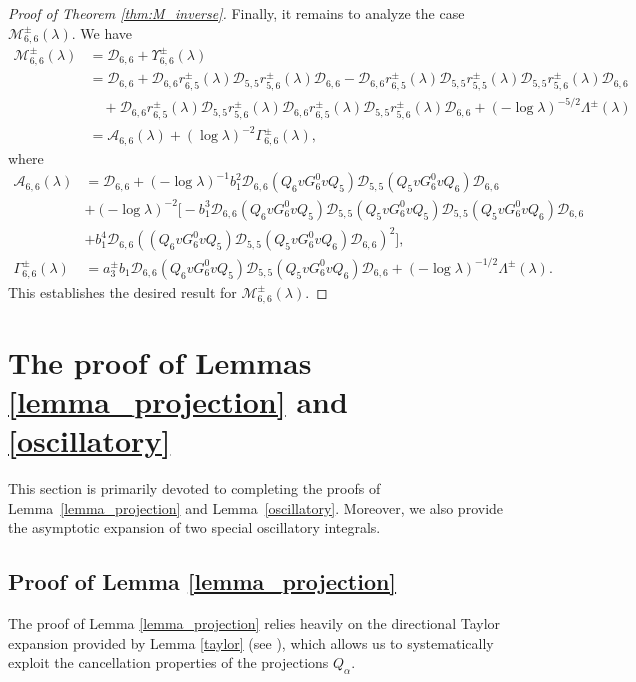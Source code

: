 \documentclass[reqno]{amsart}
\numberwithin{equation}{section}
\begin{document}
\begin{proof}[Proof of Theorem \ref{thm:M_inverse}]
Finally,
	it remains to analyze the case $\mathcal{M}_{6,6}^{\pm}(\lambda)$. We have
	\begin{align*}
		\mathcal{M}_{6,6}^{\pm}(\lambda) &=\mathcal{D}_{6,6}+ \Upsilon_{6,6}^\pm(\lambda) \\
	&=\mathcal{D}_{6,6}+\mathcal{D}_{6,6} r_{6,5}^{\pm}(\lambda) \mathcal{D}_{5,5}r_{5,6}^{\pm}(\lambda) \mathcal{D}_{6,6} - \mathcal{D}_{6,6} r_{6,5}^{\pm}(\lambda) \mathcal{D}_{5,5} r_{5,5}^{\pm}(\lambda) \mathcal{D}_{5,5}r_{5,6}^{\pm}(\lambda) \mathcal{D}_{6,6} \\
		&\quad +\mathcal{D}_{6,6} r_{6,5}^{\pm}(\lambda) \mathcal{D}_{5,5} r_{5,6}^{\pm}(\lambda) \mathcal{D}_{6,6} r_{6,5}^{\pm}(\lambda) \mathcal{D}_{5,5} r_{5,6}^{\pm}(\lambda) \mathcal{D}_{6,6}+ (-\log \lambda)^{-5/2} \Lambda^\pm(\lambda)  \\
		&=  \mathcal{A}_{6,6}(\lambda) + (\log \lambda)^{-2} \Gamma_{6,6}^{\pm}(\lambda),
	\end{align*}
	where
	\begin{align}
		\mathcal{A}_{6,6}(\lambda) &=\mathcal{D}_{6,6}+(-\log \lambda)^{-1}
		b_1^2 \mathcal{D}_{6,6} (Q_6 v G_6^0 v Q_5) \mathcal{D}_{5,5} (Q_5 v G_6^0 v Q_6) \mathcal{D}_{6,6}\nonumber \\
		&+(-\log \lambda)^{-2} \Big[-b_1^3\mathcal{D}_{6,6} (Q_6 v G_6^0 v Q_5) \mathcal{D}_{5,5} (Q_5 v G_6^0 v Q_5) \mathcal{D}_{5,5}(Q_5 v G_6^0 v Q_6) \mathcal{D}_{6,6}\nonumber\\
	&+b_1^4\mathcal{D}_{6,6}\left((Q_6 v G_6^0 v Q_5) \mathcal{D}_{5,5} (Q_5 v G_6^0 v Q_6) \mathcal{D}_{6,6}\right)^2 \Big],\nonumber\\
		\Gamma_{6,6}^{\pm}(\lambda) &= a_3^{\pm }b_1 \mathcal{D}_{6,6} (Q_6 v G_6^0 v Q_5) \mathcal{D}_{5,5}(Q_5v G_6^0 v Q_6) \mathcal{D}_{6,6}  + (-\log \lambda)^{-1/2} \Lambda^\pm(\lambda).\label{Gamma66}
	\end{align}
	This establishes the desired result for $\mathcal{M}_{6,6}^{\pm}(\lambda)$.
\end{proof}


\section{The proof of Lemmas \ref{lemma_projection} and \ref{oscillatory}}\label{section 8}
This section is primarily devoted to completing the proofs of Lemma~\ref{lemma_projection} and Lemma~\ref{oscillatory}. Moreover, we also provide the asymptotic expansion of two special oscillatory integrals.

\subsection{Proof of Lemma \ref{lemma_projection}}
The proof of Lemma \ref{lemma_projection} relies heavily on the directional Taylor expansion provided by Lemma \ref{taylor} (see \cite[Lemma 3.5]{LSY21}), which allows us to systematically exploit the  cancellation properties of the projections $Q_{\alpha}$.     
\end{document}

